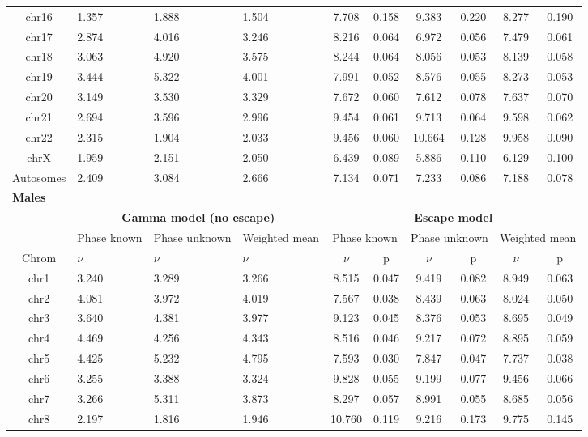 \begin{table}[!h]
\begin{tabular}{|c|p{1.1cm}p{1.2cm}p{1.3cm}|cccccc|}
    chr16 & 1.357 & 1.888 & 1.504 & 7.708 & 0.158 & 9.383 & 0.220 & 8.277 & 0.190 \\
    chr17 & 2.874 & 4.016 & 3.246 & 8.216 & 0.064 & 6.972 & 0.056 & 7.479 & 0.061 \\
    chr18 & 3.063 & 4.920 & 3.575 & 8.244 & 0.064 & 8.056 & 0.053 & 8.139 & 0.058 \\
    chr19 & 3.444 & 5.322 & 4.001 & 7.991 & 0.052 & 8.576 & 0.055 & 8.273 & 0.053 \\
    chr20 & 3.149 & 3.530 & 3.329 & 7.672 & 0.060 & 7.612 & 0.078 & 7.637 & 0.070 \\
    chr21 & 2.694 & 3.596 & 2.996 & 9.454 & 0.061 & 9.713 & 0.064 & 9.598 & 0.062 \\
    chr22 & 2.315 & 1.904 & 2.033 & 9.456 & 0.060 & 10.664 & 0.128 & 9.958 & 0.090 \\
    chrX & 1.959 & 2.151 & 2.050 & 6.439 & 0.089 & 5.886 & 0.110 & 6.129 & 0.100 \\
    Autosomes & 2.409 & 3.084 & 2.666 & 7.134 & 0.071 & 7.233 & 0.086 & 7.188 & 0.078 \\
    \hline\hline
    \multicolumn{10}{|l|}{\textbf{Males}} \\ \hline
    & \multicolumn{3}{c|}{\textbf{Gamma model (no escape)}} & \multicolumn{6}{c|}{\textbf{Escape model}} \\
    & Phase known & Phase \mbox{unknown} & Weighted mean & 
    \multicolumn{2}{c}{Phase known} & \multicolumn{2}{c}{Phase unknown} & \multicolumn{2}{c|}{Weighted mean} \\
    Chrom & $\nu$ & $\nu$ & $\nu$ & $\nu$ & p & $\nu$ & p & $\nu$ & p \\ \hline
    chr1 & 3.240 & 3.289 & 3.266 & 8.515 & 0.047 & 9.419 & 0.082 & 8.949 & 0.063 \\
    chr2 & 4.081 & 3.972 & 4.019 & 7.567 & 0.038 & 8.439 & 0.063 & 8.024 & 0.050 \\
    chr3 & 3.640 & 4.381 & 3.977 & 9.123 & 0.045 & 8.376 & 0.053 & 8.695 & 0.049 \\
    chr4 & 4.469 & 4.256 & 4.343 & 8.516 & 0.046 & 9.217 & 0.072 & 8.895 & 0.059 \\
    chr5 & 4.425 & 5.232 & 4.795 & 7.593 & 0.030 & 7.847 & 0.047 & 7.737 & 0.038 \\
    chr6 & 3.255 & 3.388 & 3.324 & 9.828 & 0.055 & 9.199 & 0.077 & 9.456 & 0.066 \\
    chr7 & 3.266 & 5.311 & 3.873 & 8.297 & 0.057 & 8.991 & 0.055 & 8.685 & 0.056 \\
    chr8 & 2.197 & 1.816 & 1.946 & 10.760 & 0.119 & 9.216 & 0.173 & 9.775 & 0.145 \\

\end{tabular}
\end{table}
